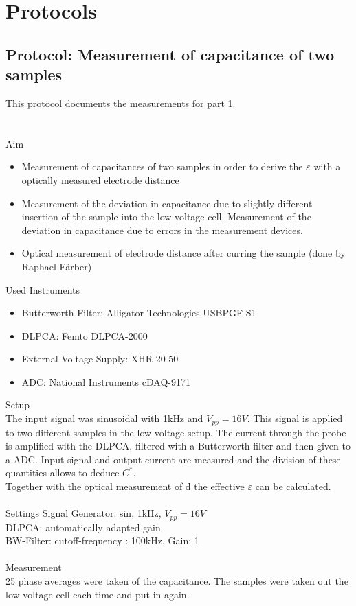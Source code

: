 \chapter{Protocols}
\section{Protocol: Measurement of capacitance of two samples}
This protocol documents the measurements for part 1. \\
\\
\\
{\Large Aim}
\begin{itemize}
\item Measurement of capacitances of two samples in order to derive the $\varepsilon$ with a optically measured electrode distance 
\item Measurement of the deviation in capacitance due to slightly different insertion of the sample into the low-voltage cell. Measurement of the deviation in capacitance due to errors in the measurement devices. 
\item Optical measurement of electrode distance after curring the sample (done by Raphael F\"arber)
\end{itemize}
{\Large Used Instruments}
\begin{itemize}
 \item Butterworth Filter: Alligator Technologies USBPGF-S1
 \item DLPCA: Femto DLPCA-2000
 \item External Voltage Supply:  XHR 20-50
 \item ADC: National Instruments cDAQ-9171

\end{itemize}
{\Large Setup}\\
The input signal was  sinusoidal with 1kHz and $V_{pp}=16V$. This signal is applied to two different samples in the low-voltage-setup. The current through the probe is amplified with the DLPCA, filtered with a Butterworth filter and then given to a ADC. 
Input signal and output current are measured and the division of these quantities allows to deduce $C^*$.\\
Together with the optical measurement of d the effective $\varepsilon$ can be calculated.\\
\\
{\Large Settings} \newline
Signal Generator:  sin, 1kHz, $V_{pp}=16V$\\
DLPCA:  automatically adapted gain\\
BW-Filter:  cutoff-frequency : 100kHz, Gain: 1\\
\\
{\Large Measurement} \\
25 phase averages were taken of the capacitance. The samples were taken out the low-voltage cell each time and put in again.

